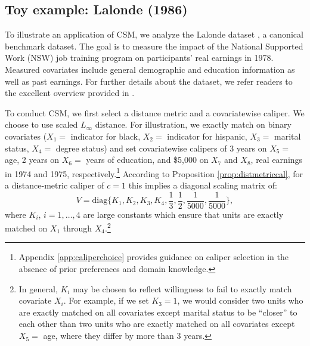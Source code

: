 \documentclass{article}
\begin{document}



\subsection{Toy example: Lalonde (1986)}
\label{sec:lalonde}

To illustrate an application of CSM, we analyze the Lalonde dataset \citep{lalonde1986evaluating}, a canonical benchmark dataset.
The goal is to measure the impact of the National Supported Work (NSW) job training program on participants' real earnings in 1978.
Measured covariates include general demographic and education information as well as past earnings.
For further details about the dataset, we refer readers to the excellent overview provided in \citet{diamond2013genetic}.

To conduct CSM, we first select a distance metric and a covariatewise caliper.
We choose to use scaled $L_\infty$ distance.
For illustration, we exactly match on binary covariates ($X_1 =$ indicator for black, $X_2 =$ indicator for hispanic, $X_3 =$ marital status, $X_4 =$ degree status) and set covariatewise calipers of 3 years on $X_5 =$ age, 2 years on $X_6 =$ years of education, and \$5,000 on $X_7$ and $X_8$, real earnings in 1974 and 1975, respectively.\footnote{Appendix \ref{app:caliperchoice} provides guidance on caliper selection in the absence of prior preferences and domain knowledge.}
According to Proposition \ref{prop:distmetriccal}, for a distance-metric caliper of $c=1$ this implies a diagonal scaling matrix of:
$$V = \text{diag} \{K_1, K_2, K_3, K_4, \frac{1}{3}, \frac{1}{2}, \frac{1}{5000}, \frac{1}{5000}\},$$
where $K_i$, $i=1,\dots,4$ are large constants which ensure that units are exactly matched on $X_1$ through $X_4$.\footnote{In general, $K_i$ may be chosen to reflect willingness to fail to exactly match covariate $X_i$.
For example, if we set $K_3 = 1$, we would consider two units who are exactly matched on all covariates except marital status to be ``closer'' to each other than two units who are exactly matched on all covariates except $X_5=$ age, where they differ by more than 3 years.}
\end{document}
